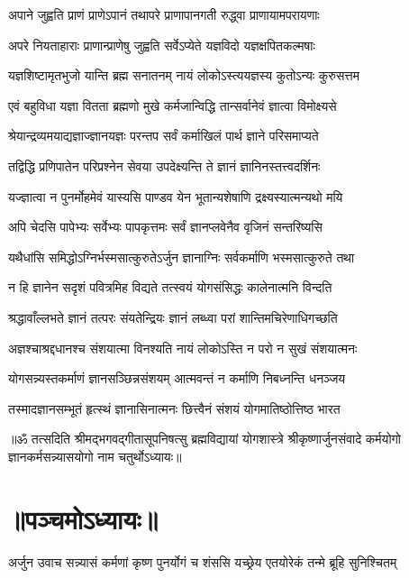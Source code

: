 \twolineshloka
{अपाने जुह्वति प्राणं प्राणेऽपानं तथापरे}
{प्राणापानगती रुद्ध्वा प्राणायामपरायणाः}%

\twolineshloka
{अपरे नियताहाराः प्राणान्प्राणेषु जुह्वति}
{सर्वेऽप्येते यज्ञविदो यज्ञक्षपितकल्मषाः}%

\twolineshloka
{यज्ञशिष्टामृतभुजो यान्ति ब्रह्म सनातनम्}
{नायं लोकोऽस्त्ययज्ञस्य कुतोऽन्यः कुरुसत्तम}%

\twolineshloka
{एवं बहुविधा यज्ञा वितता ब्रह्मणो मुखे}
{कर्मजान्विद्धि तान्सर्वानेवं ज्ञात्वा विमोक्ष्यसे}%

\twolineshloka
{श्रेयान्द्रव्यमयाद्यज्ञाज्ज्ञानयज्ञः परन्तप}
{सर्वं कर्माखिलं पार्थ ज्ञाने परिसमाप्यते}%

\twolineshloka
{तद्विद्धि प्रणिपातेन परिप्रश्नेन सेवया}
{उपदेक्ष्यन्ति ते ज्ञानं ज्ञानिनस्तत्त्वदर्शिनः}%

\twolineshloka
{यज्ज्ञात्वा न पुनर्मोहमेवं यास्यसि पाण्डव}
{येन भूतान्यशेषाणि द्रक्ष्यस्यात्मन्यथो मयि}%

\twolineshloka
{अपि चेदसि पापेभ्यः सर्वेभ्यः पापकृत्तमः}
{सर्वं ज्ञानप्लवेनैव वृजिनं सन्तरिष्यसि}%

\twolineshloka
{यथैधांसि समिद्धोऽग्निर्भस्मसात्कुरुतेऽर्जुन}
{ज्ञानाग्निः सर्वकर्माणि भस्मसात्कुरुते तथा}%

\twolineshloka
{न हि ज्ञानेन सदृशं पवित्रमिह विद्यते}
{तत्स्वयं योगसंसिद्धः कालेनात्मनि विन्दति}%

\twolineshloka
{श्रद्धावाँल्लभते ज्ञानं तत्परः संयतेन्द्रियः}
{ज्ञानं लब्ध्वा परां शान्तिमचिरेणाधिगच्छति}%

\twolineshloka
{अज्ञश्चाश्रद्दधानश्च संशयात्मा विनश्यति}
{नायं लोकोऽस्ति न परो न सुखं संशयात्मनः}%

\twolineshloka
{योगसन्न्यस्तकर्माणं ज्ञानसञ्छिन्नसंशयम्}
{आत्मवन्तं न कर्माणि निबध्नन्ति धनञ्जय}%

\twolineshloka
{तस्मादज्ञानसम्भूतं हृत्स्थं ज्ञानासिनात्मनः}
{छित्त्वैनं संशयं योगमातिष्ठोत्तिष्ठ भारत}%

{॥ॐ तत्सदिति श्रीमद्भगवद्गीतासूपनिषत्सु ब्रह्मविद्यायां योगशास्त्रे श्रीकृष्णार्जुनसंवादे कर्मयोगो ज्ञानकर्मसन्न्यासयोगो नाम चतुर्थोऽध्यायः॥}

\section{॥पञ्चमोऽध्यायः॥}
{अर्जुन उवाच}
\twolineshloka
{सन्न्यासं कर्मणां कृष्ण पुनर्योगं च शंससि}
{यच्छ्रेय एतयोरेकं तन्मे ब्रूहि सुनिश्चितम्}%

